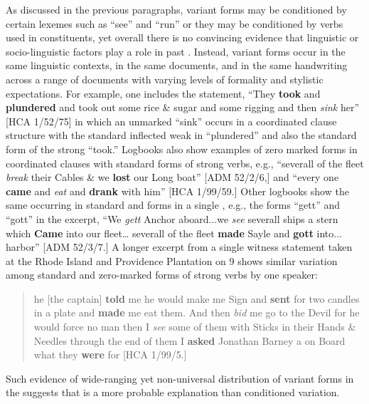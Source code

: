 As discussed in the previous paragraphs,  variant forms may be conditioned by certain lexemes such as “see” and “run” or they may be conditioned by verbs used in  constituents, yet overall there is no convincing evidence that linguistic or socio-linguistic factors play a role in past . Instead, variant forms occur in the same linguistic contexts, in the same documents, and in the same handwriting across a range of documents with varying levels of formality and stylistic expectations. For example, one  includes the statement, “They \textbf{took} and \textbf{plundered} and took out some rice \& sugar and some rigging and then \textit{sink} her” [HCA 1/52/75] in which an unmarked  “sink” occurs in a coordinated clause structure with the standard inflected weak  in  “plundered” and also the standard form of the strong   “took.” Logbooks also show examples of zero marked  forms in coordinated clauses with standard forms of strong verbs, e.g., “severall of the fleet \textit{break} their Cables \& we \textbf{lost} our Long boat” [ADM 52/2/6,] and “every one \textbf{came} and \textit{eat} and \textbf{drank} with him” [HCA 1/99/59.] Other logbooks show the same  occurring in standard and  forms in a single , e.g., the  forms “gett” and “gott” in the excerpt, “We \textit{gett} Anchor aboard...we \textit{see} severall ships a stern which \textbf{Came} into our fleet… severall of the fleet \textbf{made} Sayle and \textbf{gott} into... harbor” [ADM 52/3/7.] A longer excerpt from a single witness statement taken at the Rhode Island and Providence Plantation on 9 \citealt{September1725} shows similar variation among standard and zero-marked forms of strong verbs by one speaker:

\begin{quotation}
he [the captain] \textbf{told} me he would make me Sign and \textbf{sent} for two candles in a plate and \textbf{made} me eat them. And then \textit{bid} me go to the Devil for he would force no man then I \textit{see} some of them with Sticks in their Hands \& Needles through the end of them I \textbf{asked} Jonathan Barney a  on Board what they \textbf{were} for [HCA 1/99/5.]\end{quotation}

Such evidence of wide-ranging yet non-universal distribution of variant forms in the  suggests that  is a more probable explanation than conditioned variation.

